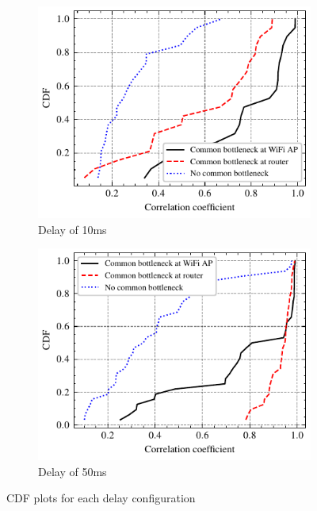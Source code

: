 \begin{figure}
  \centering
  \begin{subfigure}{0.49\textwidth}
    \centering
    \includegraphics[width=\textwidth]{figures/delay/delay-10-no-only-video.pdf}
    \caption{\label{subfig:delay-10}Delay of 10ms}
  \end{subfigure}%
  \hfill
  \begin{subfigure}{0.49\textwidth}
    \centering
    \includegraphics[width=\textwidth]{figures/delay/delay-50-no-only-video.pdf}
    \caption{\label{subfig:delay-50}Delay of 50ms}
  \end{subfigure}%
  \caption{\label{fig:cdf-delay}CDF plots for each delay configuration}
\end{figure}
